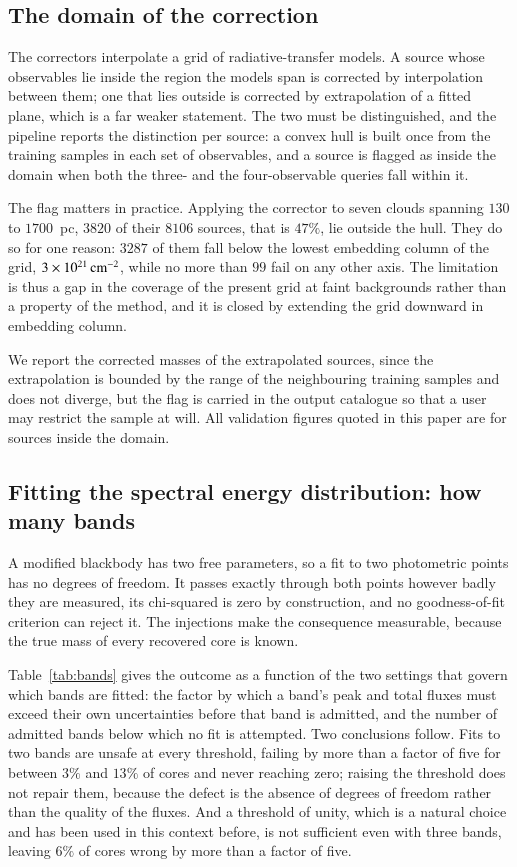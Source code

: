 \documentclass{aa}
\begin{document}
\subsection{The domain of the correction}
\label{sec:domain}

The correctors interpolate a grid of radiative-transfer models. A source whose
observables lie inside the region the models span is corrected by
interpolation between them; one that lies outside is corrected by extrapolation
of a fitted plane, which is a far weaker statement. The two must be
distinguished, and the pipeline reports the distinction per source: a convex
hull is built once from the training samples in each set of observables, and a
source is flagged as inside the domain when both the three- and the
four-observable queries fall within it.

The flag matters in practice. Applying the corrector to seven clouds spanning
$130$ to $1700$~pc, $3820$ of their $8106$ sources, that is $47\%$, lie outside
the hull. They do
so for one reason: $3287$ of them fall below the lowest embedding column of
the grid, $3\times10^{21}\,{\rm cm^{-2}}$, while no more than $99$ fail on any
other axis. The limitation is thus a gap in the coverage of the present grid
at faint backgrounds rather than a property of the method, and it is closed by
extending the grid downward in embedding column.

We report the corrected masses of the extrapolated sources, since the
extrapolation is bounded by the range of the neighbouring training samples and
does not diverge, but the flag is carried in the output catalogue so that a
user may restrict the sample at will. All validation figures quoted in this
paper are for sources inside the domain.

\subsection{Fitting the spectral energy distribution: how many bands}
\label{sec:bands}

A modified blackbody has two free parameters, so a fit to two photometric
points has no degrees of freedom. It passes exactly through both points however
badly they are measured, its chi-squared is zero by construction, and no
goodness-of-fit criterion can reject it. The injections make the consequence
measurable, because the true mass of every recovered core is known.

Table~\ref{tab:bands} gives the outcome as a function of the two settings that
govern which bands are fitted: the factor by which a band's peak and total
fluxes must exceed their own uncertainties before that band is admitted, and
the number of admitted bands below which no fit is attempted. Two conclusions
follow. Fits to two bands are unsafe at every threshold, failing by more than
a factor of five for between $3\%$ and $13\%$ of cores and never reaching zero;
raising the threshold does not repair them, because the defect is the absence
of degrees of freedom rather than the quality of the fluxes. And a threshold of
unity, which is a natural choice and has been used in this context before, is
not sufficient even with three bands, leaving $6\%$ of cores wrong by more than
a factor of five.
\end{document}

